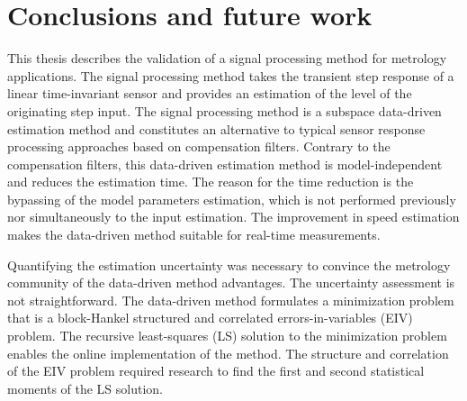 \glsresetall

\chapter[Conclusions and future work]{Conclusions and \linebreak future work} \label{chap:concl}




This thesis describes the validation of a signal processing method for metrology applications.
The signal processing method takes the transient step response of a linear time-invariant sensor and provides an estimation of the level of the originating step input.
The signal processing method is a subspace data-driven estimation method and constitutes an alternative to typical sensor response processing approaches based on compensation filters.
Contrary to the compensation filters, this data-driven estimation method is model-independent and reduces the estimation time. 
The reason for the time reduction is the bypassing of the model parameters estimation, which is not performed previously nor simultaneously to the input estimation.
The improvement in speed estimation makes the data-driven method suitable for real-time measurements.


Quantifying the estimation uncertainty was necessary to convince the metrology community of the data-driven method advantages.
The uncertainty assessment is not straightforward.
The data-driven method formulates a minimization problem that is a block-Hankel structured and correlated errors-in-variables (EIV) problem.
The recursive least-squares (LS) solution to the minimization problem enables the online implementation of the method.
The structure and correlation of the EIV problem required research to find the first and second statistical moments of the LS solution.



